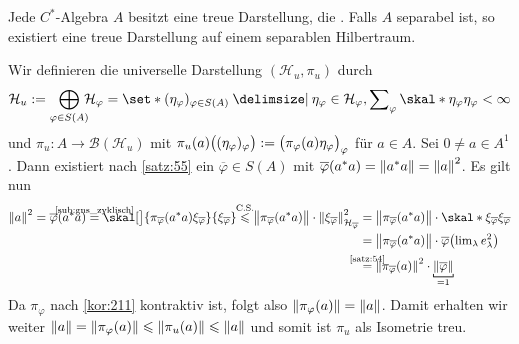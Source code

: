 \begin{satz}[{name=[Existenz treuer Darstellungen]},label=satz:512]
	Jede $C^*$-Algebra $A$ besitzt eine treue Darstellung, die . 
	Falls $A$ separabel ist, so existiert eine treue Darstellung auf einem separablen Hilbertraum.
\end{satz}
\begin{beweis}
	Wir definieren die universelle Darstellung $(\mathcal{H}_u,\pi_u)$ durch 
	\[
		\mathcal{H}_u := \bigoplus_{\varphi \in S(A)} \!\!\!\mathcal{H}_\varphi = \set*{(\eta_\varphi)_{\varphi \in S(A)} \given \eta_\varphi \in \mathcal{H}_\varphi, \sum\nolimits_{\varphi} \skal*{\eta_\varphi}{\eta_\varphi} <\infty}
	\]
	und $\pi_u \colon A \to \mathcal{B}(\mathcal{H}_u)$ mit $\pi_u (a) \enbrace[\big]{(\eta_\varphi)_\varphi} := \enbrace[\big]{\pi_\varphi(a) \eta_\varphi}_\varphi$ für $a \in A$.
	Sei $0 \neq a \in A^1$. Dann existiert nach \autoref{satz:55} ein $\overline{\varphi} \in S(A)$ mit $\overline{\varphi}(a^*a)=\norm*{a^*a}=\norm*{a}^2$.
	Es gilt nun
	\begin{align}
		\norm*{a}^2 = \overline{\varphi}(a^*a) \StackTextClap{\ref{sub:gns_zyklisch}}{=}  \skal[\big]{\pi_{\overline{\varphi}} (a^*a) \xi_{\overline{\varphi}}}{\xi_{\overline{\varphi}}}
		\StackTextClap{C.S.}{\le} \norm[\big]{\pi_{\overline{\varphi}}(a^*a)} \cdot \norm*{\xi_{\overline{\varphi}}}^2_{\mathcal{H}_{\overline{\varphi}}} 
		&= \norm[\big]{\pi_{\overline{\varphi}}(a^*a)} \cdot \skal*{\xi_{\overline{\varphi}}}{\xi_{\overline{\varphi}}} \\
		&=\norm[\big]{\pi_{\overline{\varphi}}(a^*a)} \cdot \overline{\varphi} \enbrace*{\lim\nolimits_\lambda e_\lambda^2}\\
		&\StackTextClap{\ref{satz:54}}{=} \norm*{\pi_{\overline{\varphi}}(a)}^2 \cdot \Underbracket{\norm*{\overline{\varphi}}}{=1}
	\end{align}
	Da $\pi_\varphi$ nach \autoref{kor:211} kontraktiv ist, folgt also $\norm*{\pi_\varphi(a)}= \norm*{a}$.
	Damit erhalten wir weiter $\norm*{a} = \norm*{\pi_\varphi(a)} \le \norm*{\pi_u(a)} \le \norm*{a}$ und somit ist $\pi_u$ als Isometrie treu.

\end{beweis}
